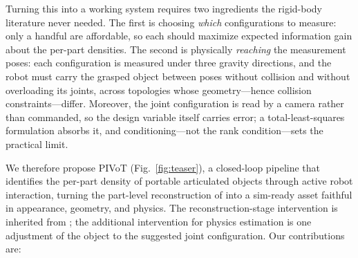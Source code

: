 Turning this into a working system requires two ingredients the rigid-body literature never needed. The first is choosing \emph{which} configurations to measure: only a handful are affordable, so each should maximize expected information gain about the per-part densities. The second is physically \emph{reaching} the measurement poses: each configuration is measured under three gravity directions, and the robot must carry the grasped object between poses without collision and without overloading its joints, across topologies whose geometry---hence collision constraints---differ. Moreover, the joint configuration is read by a camera rather than commanded, so the design variable itself carries error; a total-least-squares formulation absorbs it, and conditioning---not the rank condition---sets the practical limit.

We therefore propose PIVoT (Fig.~\ref{fig:teaser}), a closed-loop pipeline that identifies the per-part density of portable articulated objects through active robot interaction, turning the part-level reconstruction of \cite{lee2026rora} into a sim-ready asset faithful in appearance, geometry, and physics. The reconstruction-stage intervention is inherited from \cite{lee2026rora}; the additional intervention for physics estimation is one adjustment of the object to the suggested joint configuration. Our contributions are:

